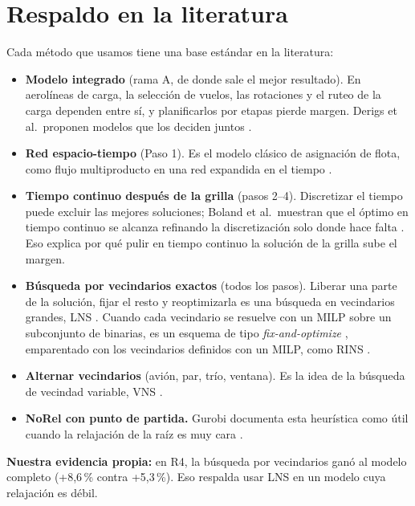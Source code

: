 \documentclass[11pt,a4paper]{article}
\begin{document}
\section{Respaldo en la literatura}

Cada método que usamos tiene una base estándar en la literatura:

\begin{itemize}
  \item \textbf{Modelo integrado} (rama A, de donde sale el mejor resultado). En aerolíneas de carga, la selección de vuelos, las rotaciones y el ruteo de la carga dependen entre sí, y planificarlos por etapas pierde margen. Derigs et al.\ proponen modelos que los deciden juntos \cite{derigs2009, derigs2013}.
  \item \textbf{Red espacio-tiempo} (Paso 1). Es el modelo clásico de asignación de flota, como flujo multiproducto en una red expandida en el tiempo \cite{hane1995}.
  \item \textbf{Tiempo continuo después de la grilla} (pasos 2--4). Discretizar el tiempo puede excluir las mejores soluciones; Boland et al.\ muestran que el óptimo en tiempo continuo se alcanza refinando la discretización solo donde hace falta \cite{boland2017}. Eso explica por qué pulir en tiempo continuo la solución de la grilla sube el margen.
  \item \textbf{Búsqueda por vecindarios exactos} (todos los pasos). Liberar una parte de la solución, fijar el resto y reoptimizarla es una búsqueda en vecindarios grandes, LNS \cite{shaw1998, pisinger2010}. Cuando cada vecindario se resuelve con un MILP sobre un subconjunto de binarias, es un esquema de tipo \emph{fix-and-optimize} \cite{helber2010}, emparentado con los vecindarios definidos con un MILP, como RINS \cite{danna2005}.
  \item \textbf{Alternar vecindarios} (avión, par, trío, ventana). Es la idea de la búsqueda de vecindad variable, VNS \cite{mladenovic1997}.
  \item \textbf{NoRel con punto de partida.} Gurobi documenta esta heurística como útil cuando la relajación de la raíz es muy cara \cite{gurobi}.
\end{itemize}

\textbf{Nuestra evidencia propia:} en R4, la búsqueda por vecindarios ganó al modelo completo (+8,6\,\% contra +5,3\,\%). Eso respalda usar LNS en un modelo cuya relajación es débil.
\end{document}

